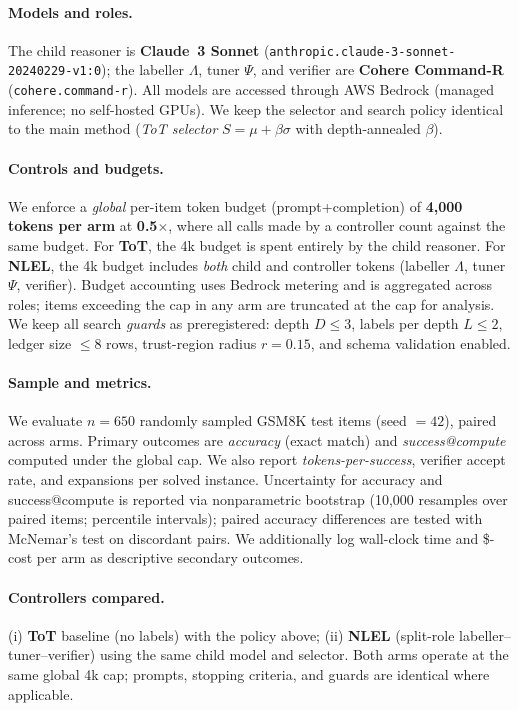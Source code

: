 \documentclass{article}
\theoremstyle{plain}
\theoremstyle{definition}
\theoremstyle{remark}
\begin{document}
\paragraph{Models and roles.}
The child reasoner is \textbf{Claude~3 Sonnet} (\texttt{anthropic.claude-3-sonnet-20240229-v1:0}); the labeller $\Lambda$, tuner $\Psi$, and verifier are \textbf{Cohere Command-R} (\texttt{cohere.command-r}).
All models are accessed through AWS Bedrock (managed inference; no self-hosted GPUs).
We keep the selector and search policy identical to the main method (\emph{ToT selector} $S=\mu+\beta\sigma$ with depth-annealed $\beta$).

\paragraph{Controls and budgets.}
We enforce a \emph{global} per-item token budget (prompt{+}completion) of \textbf{4{,}000 tokens per arm} at \textbf{0.5$\times$}, where all calls made by a controller count against the same budget.
For \textbf{ToT}, the 4k budget is spent entirely by the child reasoner.
For \textbf{NLEL}, the 4k budget includes \emph{both} child and controller tokens (labeller $\Lambda$, tuner $\Psi$, verifier).
Budget accounting uses Bedrock metering and is aggregated across roles; items exceeding the cap in any arm are truncated at the cap for analysis.
We keep all search \emph{guards} as preregistered: depth $D\!\le\!3$, labels per depth $L\!\le\!2$, ledger size $\le\!8$ rows, trust-region radius $r\!=\!0.15$, and schema validation enabled.

\paragraph{Sample and metrics.}
We evaluate \textbf{$n=650$} randomly sampled GSM8K test items (seed $=42$), paired across arms.
Primary outcomes are \emph{accuracy} (exact match) and \emph{success@compute} computed under the global cap.
We also report \emph{tokens-per-success}, verifier accept rate, and expansions per solved instance.
Uncertainty for accuracy and success@compute is reported via nonparametric bootstrap (10{,}000 resamples over paired items; percentile intervals); paired accuracy differences are tested with McNemar's test on discordant pairs.
We additionally log wall-clock time and \$-cost per arm as descriptive secondary outcomes.

\paragraph{Controllers compared.}
(i) \textbf{ToT} baseline (no labels) with the policy above; (ii) \textbf{NLEL} (split-role labeller–tuner–verifier) using the same child model and selector.
Both arms operate at the same global 4k cap; prompts, stopping criteria, and guards are identical where applicable.
\end{document}
